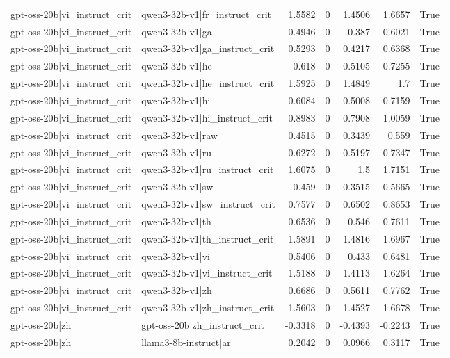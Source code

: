 \begin{table}
\begin{tabular}{l l r r r r l}
gpt-oss-20b|vi_instruct_crit & qwen3-32b-v1|fr_instruct_crit & 1.5582 & 0 & 1.4506 & 1.6657 & True \\
gpt-oss-20b|vi_instruct_crit & qwen3-32b-v1|ga & 0.4946 & 0 & 0.387 & 0.6021 & True \\
gpt-oss-20b|vi_instruct_crit & qwen3-32b-v1|ga_instruct_crit & 0.5293 & 0 & 0.4217 & 0.6368 & True \\
gpt-oss-20b|vi_instruct_crit & qwen3-32b-v1|he & 0.618 & 0 & 0.5105 & 0.7255 & True \\
gpt-oss-20b|vi_instruct_crit & qwen3-32b-v1|he_instruct_crit & 1.5925 & 0 & 1.4849 & 1.7 & True \\
gpt-oss-20b|vi_instruct_crit & qwen3-32b-v1|hi & 0.6084 & 0 & 0.5008 & 0.7159 & True \\
gpt-oss-20b|vi_instruct_crit & qwen3-32b-v1|hi_instruct_crit & 0.8983 & 0 & 0.7908 & 1.0059 & True \\
gpt-oss-20b|vi_instruct_crit & qwen3-32b-v1|raw & 0.4515 & 0 & 0.3439 & 0.559 & True \\
gpt-oss-20b|vi_instruct_crit & qwen3-32b-v1|ru & 0.6272 & 0 & 0.5197 & 0.7347 & True \\
gpt-oss-20b|vi_instruct_crit & qwen3-32b-v1|ru_instruct_crit & 1.6075 & 0 & 1.5 & 1.7151 & True \\
gpt-oss-20b|vi_instruct_crit & qwen3-32b-v1|sw & 0.459 & 0 & 0.3515 & 0.5665 & True \\
gpt-oss-20b|vi_instruct_crit & qwen3-32b-v1|sw_instruct_crit & 0.7577 & 0 & 0.6502 & 0.8653 & True \\
gpt-oss-20b|vi_instruct_crit & qwen3-32b-v1|th & 0.6536 & 0 & 0.546 & 0.7611 & True \\
gpt-oss-20b|vi_instruct_crit & qwen3-32b-v1|th_instruct_crit & 1.5891 & 0 & 1.4816 & 1.6967 & True \\
gpt-oss-20b|vi_instruct_crit & qwen3-32b-v1|vi & 0.5406 & 0 & 0.433 & 0.6481 & True \\
gpt-oss-20b|vi_instruct_crit & qwen3-32b-v1|vi_instruct_crit & 1.5188 & 0 & 1.4113 & 1.6264 & True \\
gpt-oss-20b|vi_instruct_crit & qwen3-32b-v1|zh & 0.6686 & 0 & 0.5611 & 0.7762 & True \\
gpt-oss-20b|vi_instruct_crit & qwen3-32b-v1|zh_instruct_crit & 1.5603 & 0 & 1.4527 & 1.6678 & True \\
gpt-oss-20b|zh & gpt-oss-20b|zh_instruct_crit & -0.3318 & 0 & -0.4393 & -0.2243 & True \\
gpt-oss-20b|zh & llama3-8b-instruct|ar & 0.2042 & 0 & 0.0966 & 0.3117 & True \\

\end{tabular}
\end{table}
